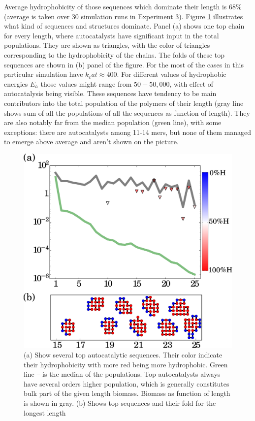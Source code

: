 \documentclass[journal=jacsat,manuscript=article,layout=twocolumn]{achemso}
\begin{document}
Average hydrophobicity of those sequences which dominate their length is $68\%$ (average is 
taken over 30 simulation runs in Experiment 3).
Figure \ref{fig:mainplayers} illustrates what kind of sequences and structures dominate. Panel 
(a) shows one top chain for every length, where autocatalysts have significant input in the 
total populations. They are shown as triangles, with the color of triangles 
corresponding to the hydrophobicity of the chains. The folds of these top sequences are shown in 
(b) panel of the figure. For the most of the cases in this particular simulation have 
$k_cat\approx400$. For different values of hydrophobic energies $E_h$ those values might range 
from $50-50,000$, with effect of autocatalysis being visible. These sequences have tendency to be 
main contributors into the total population of the polymers of their length (gray line shows sum 
of all the populations of all the sequences as function of length). They are also notably far from 
the median population (green line), with some exceptions: there are autocatalysts among 11-14 
mers, but none of them managed to emerge above average and aren't shown on the picture.
\begin{figure}[h!]
  \centering
  \includegraphics[width=\columnwidth]{pictures/mainPlayers.pdf} 
  \caption{\footnotesize{(a) Show several top autocatalytic sequences. Their color indicate their 
hydrophobicity with more red being more hydrophobic. Green line -- is the median of the 
populations. Top autocatalysts always have several orders higher population, which is generally 
constitutes bulk part of the given length biomass. Biomass as function of length is shown in 
gray. (b) Shows top sequences and their fold for the longest length}}
  \label{fig:mainplayers}
\end{figure}
\end{document}
